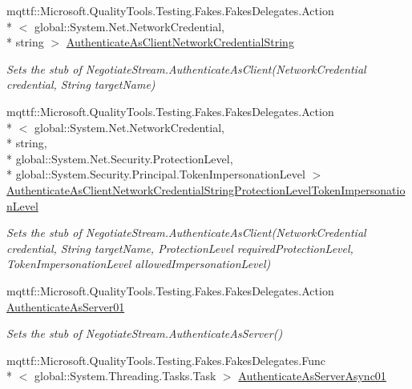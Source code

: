 \begin{DoxyCompactItemize}
mqttf\-::\-Microsoft.\-Quality\-Tools.\-Testing.\-Fakes.\-Fakes\-Delegates.\-Action\\*
$<$ global\-::\-System.\-Net.\-Network\-Credential, \\*
string $>$ \hyperlink{class_system_1_1_net_1_1_security_1_1_fakes_1_1_stub_negotiate_stream_aad84189e14cfad50f1448dae0a416a78}{Authenticate\-As\-Client\-Network\-Credential\-String}
\begin{DoxyCompactList}\small\item\em Sets the stub of Negotiate\-Stream.\-Authenticate\-As\-Client(\-Network\-Credential credential, String target\-Name)\end{DoxyCompactList}\item 
mqttf\-::\-Microsoft.\-Quality\-Tools.\-Testing.\-Fakes.\-Fakes\-Delegates.\-Action\\*
$<$ global\-::\-System.\-Net.\-Network\-Credential, \\*
string, \\*
global\-::\-System.\-Net.\-Security.\-Protection\-Level, \\*
global\-::\-System.\-Security.\-Principal.\-Token\-Impersonation\-Level $>$ \hyperlink{class_system_1_1_net_1_1_security_1_1_fakes_1_1_stub_negotiate_stream_ac58414427952817b335a38c2d0345775}{Authenticate\-As\-Client\-Network\-Credential\-String\-Protection\-Level\-Token\-Impersonation\-Level}
\begin{DoxyCompactList}\small\item\em Sets the stub of Negotiate\-Stream.\-Authenticate\-As\-Client(\-Network\-Credential credential, String target\-Name, Protection\-Level required\-Protection\-Level, Token\-Impersonation\-Level allowed\-Impersonation\-Level)\end{DoxyCompactList}\item 
mqttf\-::\-Microsoft.\-Quality\-Tools.\-Testing.\-Fakes.\-Fakes\-Delegates.\-Action \hyperlink{class_system_1_1_net_1_1_security_1_1_fakes_1_1_stub_negotiate_stream_ae8cf332d907c72194bf2841aa0b42d8b}{Authenticate\-As\-Server01}
\begin{DoxyCompactList}\small\item\em Sets the stub of Negotiate\-Stream.\-Authenticate\-As\-Server()\end{DoxyCompactList}\item 
mqttf\-::\-Microsoft.\-Quality\-Tools.\-Testing.\-Fakes.\-Fakes\-Delegates.\-Func\\*
$<$ global\-::\-System.\-Threading.\-Tasks.\-Task $>$ \hyperlink{class_system_1_1_net_1_1_security_1_1_fakes_1_1_stub_negotiate_stream_af93dd35e38c6f8545bd4900284fb911b}{Authenticate\-As\-Server\-Async01}

\end{DoxyCompactItemize}
